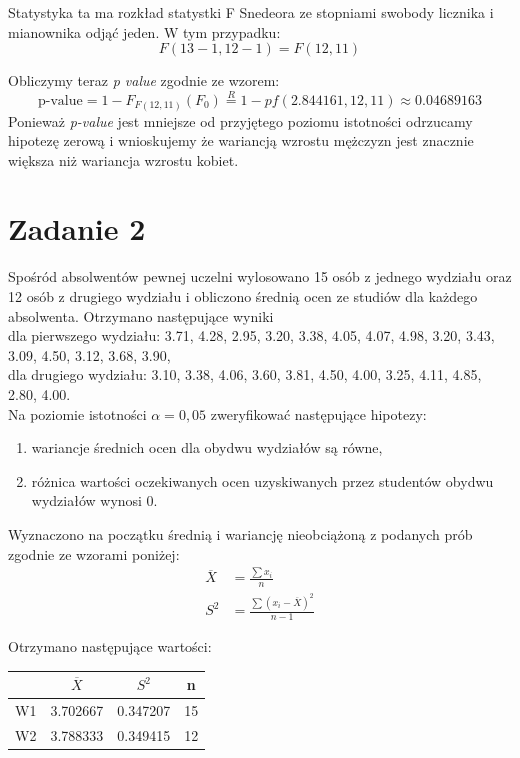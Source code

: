 \documentclass{article}
\begin{document}
Statystyka ta ma rozkład statystki F Snedeora ze stopniami swobody licznika i mianownika odjąć jeden. W tym przypadku:
\[ F(13-1, 12-1) = F(12,11) \]

Obliczymy teraz \textit{p value} zgodnie ze wzorem:
\[ \text{p-value} = 1 - F_{F(12,11)}(F_0) \overset{R}{=} 1 - pf(2.844161, 12, 11) \approx 0.04689163 \]
Ponieważ \textit{p-value} jest mniejsze od przyjętego poziomu istotności odrzucamy hipotezę zerową i wnioskujemy że wariancją wzrostu mężczyzn jest znacznie większa niż wariancja wzrostu kobiet.

\newpage
\section{Zadanie 2}
Spośród absolwentów pewnej uczelni wylosowano 15 osób z jednego wydziału oraz 12 osób z drugiego wydziału i obliczono średnią ocen ze studiów dla każdego absolwenta. Otrzymano następujące wyniki \\
dla pierwszego wydziału: 3.71, 4.28, 2.95, 3.20, 3.38, 4.05, 4.07, 4.98, 3.20, 3.43, 3.09, 4.50, 3.12, 3.68, 3.90, \\
dla drugiego wydziału: 3.10, 3.38, 4.06, 3.60, 3.81, 4.50, 4.00, 3.25, 4.11, 4.85, 2.80, 4.00. \\
Na poziomie istotności $\alpha=0,05$ zweryfikować następujące hipotezy:
\begin{enumerate}[label = \alph*)]
\item wariancje średnich ocen dla obydwu wydziałów są równe,
\item różnica wartości oczekiwanych ocen uzyskiwanych przez studentów obydwu wydziałów wynosi 0.
\end{enumerate}

Wyznaczono na początku średnią i wariancję nieobciążoną z podanych prób zgodnie ze wzorami poniżej:
\begin{align*}
\overline{X} & = \frac{\sum x_i}{n} \\
S^2 &= \frac{\sum (x_i - \overline{X})^2 }{n-1}
\end{align*}

Otrzymano następujące wartości:
\begin{center} \begin{tabular}{|c|c|c|c|} \hline
 & $\overline{X}$ & $S^2$ & n \\ \hline
W1 & 3.702667 & 0.347207 & 15\\ \hline
W2 & 3.788333 & 0.349415 & 12\\ \hline
\end{tabular} \end{center}
\end{document}
